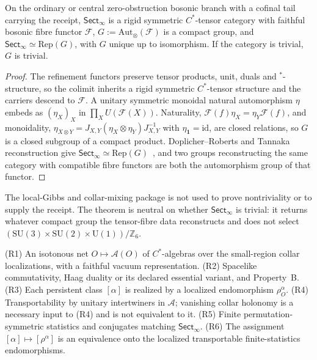 \documentclass[11pt]{article}
\begin{document}
\begin{theorem}
\label{thm:tannaka-reconstruction}
On the ordinary or central zero-obstruction bosonic branch with a cofinal
tail carrying the receipt, \(\mathsf{Sect}_\infty\) is a rigid symmetric
\(C^*\)-tensor category with faithful bosonic fibre functor \(\mathcal F\),
\(G:=\mathrm{Aut}_\otimes(\mathcal F)\) is a compact group, and
\(\mathsf{Sect}_\infty\simeq\mathrm{Rep}(G)\), with \(G\) unique up to
isomorphism. If the category is trivial, \(G\) is trivial.
\end{theorem}

\begin{proof}
The refinement functors preserve tensor products, unit, duals and
\(^*\)-structure, so the colimit inherits a rigid symmetric \(C^*\)-tensor
structure and the carriers descend to \(\mathcal F\). A unitary symmetric
monoidal natural automorphism \(\eta\) embeds as \((\eta_X)_X\) in
\(\prod_XU(\mathcal F(X))\). Naturality,
\(\mathcal F(f)\eta_X=\eta_Y\mathcal F(f)\), and monoidality,
\(\eta_{X\otimes Y}=J_{X,Y}(\eta_X\otimes\eta_Y)J_{X,Y}^{-1}\) with
\(\eta_{\mathbf 1}=\mathrm{id}\), are closed relations, so \(G\) is a closed
subgroup of a compact product. Doplicher--Roberts and Tannaka reconstruction
give \(\mathsf{Sect}_\infty\simeq\mathrm{Rep}(G)\)~\cite{dr89,dr90}, and two
groups reconstructing the same category with compatible fibre functors are
both the automorphism group of that functor.
\end{proof}

The local-Gibbs and collar-mixing package is not used to prove nontriviality
or to supply the receipt. The theorem is neutral on whether
\(\mathsf{Sect}_\infty\) is trivial: it returns whatever compact group the
tensor-fibre data reconstructs and does not select
\((\mathrm{SU}(3)\times\mathrm{SU}(2)\times\mathrm U(1))/\mathbb Z_6\).

\begin{definition}
(R1) An isotonous net \(O\mapsto\mathcal A(O)\) of \(C^*\)-algebras over the
small-region collar localizations, with a faithful vacuum representation.
(R2) Spacelike commutativity, Haag duality or its declared essential variant,
and Property~B. (R3) Each persistent class \([\alpha]\) is realized by a
localized endomorphism \(\rho^\alpha_O\). (R4) Transportability by unitary
intertwiners in \(\mathcal A\); vanishing collar holonomy is a necessary input
to (R4) and is not equivalent to it. (R5) Finite permutation-symmetric
statistics and conjugates matching \(\mathsf{Sect}_\infty\). (R6) The
assignment \([\alpha]\mapsto[\rho^\alpha]\) is an equivalence onto the
localized transportable finite-statistics endomorphisms.
\end{definition}
\end{document}
